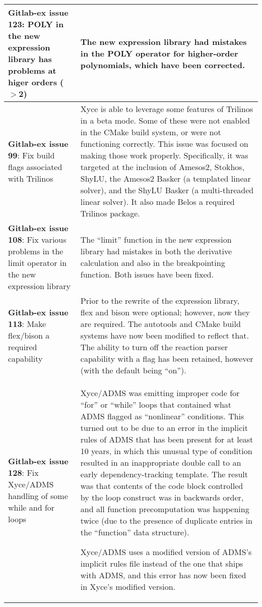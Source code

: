 {\begin{longtable}[h] {>{\raggedright\small}m{2in}|>{\raggedright\let\\\tabularnewline\small}m{3.5in}}
\textbf{Gitlab-ex issue 123}:  POLY in the new expression library has problems
at higer orders ($>$2) & The new expression library had mistakes in
the POLY operator for higher-order polynomials, which have been
corrected.
\\ \hline

\textbf{Gitlab-ex issue 99}:  Fix build flags associated with Trilinos &
Xyce is able to leverage some features of Trilinos in a beta mode. Some of
these were not enabled in the CMake build system, or were not functioning
correctly. This issue was focused on making those work properly. Specifically,
it was targeted at the inclusion of Amesos2, Stokhos, ShyLU, the Amesos2 Basker
(a templated linear solver), and the ShyLU Basker (a multi-threaded linear
solver). It also made Belos a required Trilinos package.
\\ \hline

\textbf{Gitlab-ex issue 108}:  Fix various problems in the limit operator in
the new expression library & The ``limit'' function in the new
expression library had mistakes in both the derivative calculation and
also in the breakpointing function.  Both issues have been fixed.
\\ \hline

\textbf{Gitlab-ex issue 113}:  Make flex/bison a required capability &
Prior to the rewrite of the expression library, flex and bison were optional;
however, now they are required. The autotools and CMake build systems have now
been modified to reflect that. The ability to turn off the reaction parser
capability with a flag has been retained, however (with the default being
``on'').
\\ \hline

\textbf{Gitlab-ex issue 128}: Fix Xyce/ADMS handling of some while and for loops &
Xyce/ADMS was emitting improper code for ``for'' or ``while'' loops
that contained what ADMS flagged as ``nonlinear'' conditions.  This
turned out to be due to an error in the implicit rules of ADMS that
has been present for at least 10 years, in which this unusual type of
condition resulted in an inappropriate double call to an early
dependency-tracking template.  The result was that contents of the
code block controlled by the loop construct was in backwards order,
and all function precomputation was happening twice (due to the
presence of duplicate entries in the ``function'' data structure).

Xyce/ADMS uses a modified version of ADMS's implicit rules file
instead of the one that ships with ADMS, and this error has now been
fixed in Xyce's modified version.


\end{longtable}}
